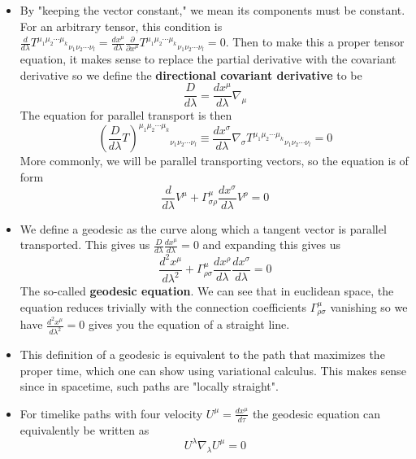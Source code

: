 \documentclass[11pt]{article}
\begin{document}
\begin{itemize}
    \item By "keeping the vector constant," we mean its components must be constant. For an arbitrary tensor, this condition is \(\frac{d}{d\lambda} T^{\mu_1 \mu_2 \cdots \mu_k}{}_{\nu_1 \nu_2 \cdots \nu_l} = \frac{dx^\mu}{d\lambda} \frac{\partial}{\partial x^\mu} T^{\mu_1 \mu_2 \cdots \mu_k}{}_{\nu_1 \nu_2 \cdots \nu_l} = 0\). 
    Then to make this a proper tensor equation, it makes sense to replace the partial derivative with the covariant derivative so we define the \textbf{directional covariant derivative} to be
    \[
        \frac{D}{d\lambda} = \frac{dx^\mu}{d\lambda}\nabla_\mu
    \]
    The equation for parallel transport is then
    \[
        \left(\frac{D}{d\lambda}T\right)^{\mu_1\mu_2\cdots\mu_k}{}_{\nu_1\nu_2\cdots\nu_l} \equiv \frac{dx^\sigma}{d\lambda} \nabla_\sigma T^{\mu_1\mu_2\cdots\mu_k}{}_{\nu_1\nu_2\cdots\nu_l} = 0
    \]
    More commonly, we will be parallel transporting vectors, so the equation is of form
    \[
        \frac{d}{d\lambda}V^\mu +\Gamma^\mu_{\sigma \rho}\frac{d x^\sigma}{d\lambda}V^\rho = 0
    \]

    \item We define a geodesic as the curve along which a tangent vector is parallel transported. This gives us \(\frac{D}{d\lambda}\frac{dx^\mu}{d\lambda} = 0\) and expanding this gives us
    \[
        \frac{d^2 x^\mu}{d\lambda^2} + \Gamma^\mu_{\rho \sigma}\frac{dx^\rho}{d\lambda}\frac{dx^\sigma}{d\lambda} = 0
    \]
    The so-called \textbf{geodesic equation}. We can see that in euclidean space, the equation reduces trivially with the connection coefficients \(\Gamma^\mu_{\rho \sigma}\) vanishing so we have 
    \(\frac{d^2 x^\mu}{d\lambda^2} = 0\) gives you the equation of a straight line. 

    \item This definition of a geodesic is equivalent to the path that maximizes the proper time, which one can show using variational calculus. This makes sense since in spacetime, such paths are "locally straight".
    
    \item For timelike paths with four velocity \(U^\mu = \frac{dx^\mu}{d\tau}\) the geodesic equation can equivalently be written as 
    \[
        U^\lambda \nabla_\lambda U^\mu = 0
    \]

    
\end{itemize}
\end{document}
